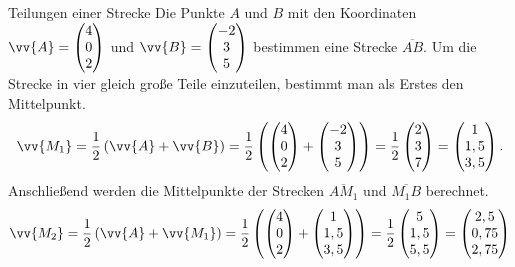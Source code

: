 \begin{bsp*}{Teilungen einer Strecke}{}
Die Punkte $A$ und $B$ mit den Koordinaten $\vv{A} = \begin{pmatrix} 4 \\0 \\2 \end{pmatrix}$ und $\vv{B}= \begin{pmatrix} -2 \\3 \\5 \end{pmatrix}$ bestimmen eine Strecke $\overline{AB}$. Um die Strecke in vier gleich große Teile einzuteilen, bestimmt man als Erstes den Mittelpunkt. $$\vv{M_1}=\dfrac{1}{2}\left(\vv{A} + \vv{B}\right) = \dfrac{1}{2}\left( \begin{pmatrix} 4 \\0 \\2 \end{pmatrix} +  \begin{pmatrix} -2 \\3 \\5 \end{pmatrix} \right)= \dfrac{1}{2}\begin{pmatrix} 2 \\3 \\7 \end{pmatrix} = \begin{pmatrix} 1 \\1,5 \\3,5 \end{pmatrix}. $$ 
Anschließend werden die Mittelpunkte der Strecken $\overline{AM_1}$ und $\overline{M_1B}$ berechnet.
$$\vv{M_2} = \dfrac{1}{2}\left(\vv{A} + \vv{M_1}\right) =  \dfrac{1}{2} \left( \begin{pmatrix} 4 \\0 \\2 \end{pmatrix}  + \begin{pmatrix} 1 \\1,5 \\3,5 \end{pmatrix} \right) = \dfrac{1}{2} \begin{pmatrix} 5 \\1,5 \\5,5 \end{pmatrix} = \begin{pmatrix} 2,5 \\0,75 \\2,75 \end{pmatrix}$$

\end{bsp*}
